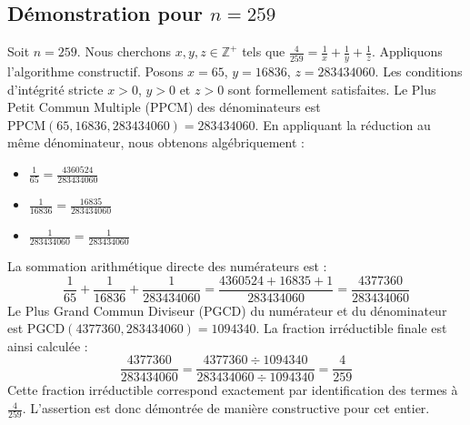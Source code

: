\documentclass[11pt,a4paper]{article}
\begin{document}
\subsection{Démonstration pour $n = 259$}
Soit $n = 259$. Nous cherchons $x, y, z \in \mathbb{Z}^{+}$ tels que $\frac{4}{259} = \frac{1}{x} + \frac{1}{y} + \frac{1}{z}$.
Appliquons l'algorithme constructif. Posons $x = 65$, $y = 16836$, $z = 283434060$.
Les conditions d'intégrité stricte $x > 0$, $y > 0$ et $z > 0$ sont formellement satisfaites.
Le Plus Petit Commun Multiple (PPCM) des dénominateurs est $\text{PPCM}(65, 16836, 283434060) = 283434060$.
En appliquant la réduction au même dénominateur, nous obtenons algébriquement :
\begin{itemize}
    \item $\frac{1}{65} = \frac{4360524}{283434060}$
    \item $\frac{1}{16836} = \frac{16835}{283434060}$
    \item $\frac{1}{283434060} = \frac{1}{283434060}$
\end{itemize}
La sommation arithmétique directe des numérateurs est :
$$ \frac{1}{65} + \frac{1}{16836} + \frac{1}{283434060} = \frac{4360524 + 16835 + 1}{283434060} = \frac{4377360}{283434060} $$
Le Plus Grand Commun Diviseur (PGCD) du numérateur et du dénominateur est $\text{PGCD}(4377360, 283434060) = 1094340$.
La fraction irréductible finale est ainsi calculée :
$$ \frac{4377360}{283434060} = \frac{4377360 \div 1094340}{283434060 \div 1094340} = \frac{4}{259} $$
Cette fraction irréductible correspond exactement par identification des termes à $\frac{4}{259}$. L'assertion est donc démontrée de manière constructive pour cet entier.
\end{document}

